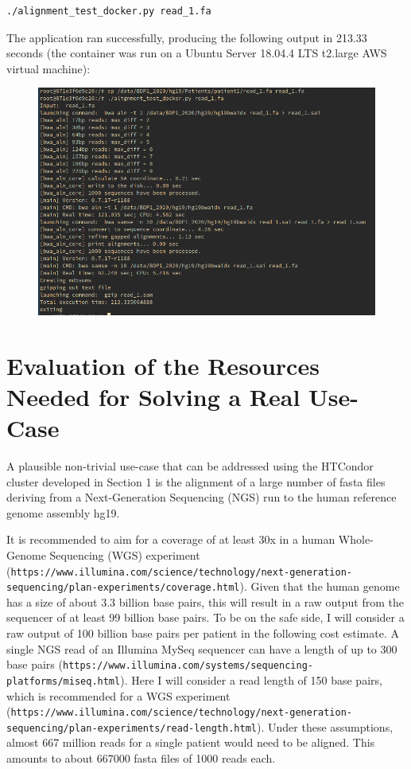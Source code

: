 \documentclass{article}
\begin{document}
\begin{lstlisting}
./alignment_test_docker.py read_1.fa
\end{lstlisting}

The application ran successfully, producing the following output in 213.33 seconds (the container was run on a Ubuntu Server 18.04.4 LTS t2.large AWS virtual machine):

\begin{figure}[!h]
    \center
    \includegraphics[width=\textwidth]{./images/docker_test_out.png}
\end{figure}

\section{Evaluation of the Resources Needed for Solving a Real Use-Case}
A plausible non-trivial use-case that can be addressed using the HTCondor cluster developed in Section 1 is the alignment of a large number of fasta files deriving from a Next-Generation Sequencing (NGS) run to the human reference genome assembly hg19.

It is recommended to aim for a coverage of at least 30x in a human Whole-Genome Sequencing (WGS) experiment (\texttt{https://www.illumina.com/science/technology/next-generation-sequencing/plan-experiments/coverage.html}).
Given that the human genome has a size of about 3.3 billion base pairs, this will result in a raw output from the sequencer of at least 99 billion base pairs.
To be on the safe side, I will consider a raw output of 100 billion base pairs per patient in the following cost estimate.
A single NGS read of an Illumina MySeq sequencer can have a length of up to 300 base pairs (\texttt{https://www.illumina.com/systems/sequencing-platforms/miseq.html}). Here I will consider a read length of 150 base pairs, which is recommended for a WGS experiment (\texttt{https://www.illumina.com/science/technology/next-generation-sequencing/plan-experiments/read-length.html}).
Under these assumptions, almost 667 million reads for a single patient would need to be aligned.
This amounts to about 667000 fasta files of 1000 reads each.
\end{document}
